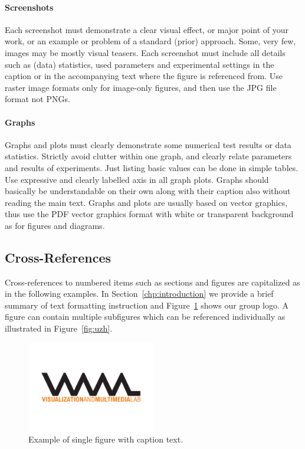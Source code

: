 \documentclass[11pt, a4paper,oneside,chapterprefix=false]{scrbook}
\begin{document}
\paragraph{Screenshots}
Each screenshot must demonstrate a clear visual effect, or major point of your work, or an example or problem of a standard (prior) approach. Some, very few, images may be mostly visual teasers. Each screenshot must include all details such as (data) statistics, used parameters and experimental settings in the caption or in the accompanying text where the figure is referenced from. Use raster image formats only for image-only figures, and then use the JPG file format not PNGs.

\paragraph{Graphs}
Graphs and plots must clearly demonstrate some numerical test results or data statistics. Strictly avoid clutter within one graph, and clearly relate parameters and results of experiments. Just listing basic values can be done in simple tables.
Use expressive and clearly labelled axis in all graph plots. Graphs should basically be understandable on their own along with their caption also without reading the main text. Graphs and plots are usually based on vector graphics, thus use the PDF vector graphics format with white or transparent background as for figures and diagrams.

\subsection*{Cross-References}

Cross-references to numbered items such as sections and figures are capitalized as in the following examples. In Section~\ref{chp:introduction} we provide a brief summary of text formatting instruction and Figure~\ref{fig:logo} shows our group logo. A figure can contain multiple subfigures which can be referenced individually as illustrated in Figure~\ref{fig:uzh}.

\begin{figure}[htp]
 \centering
 \includegraphics[width=0.5\textwidth]{figures/vmml_logo}
 \caption{Example of single figure with caption text.}
 \label{fig:logo}
\end{figure}
\end{document}
